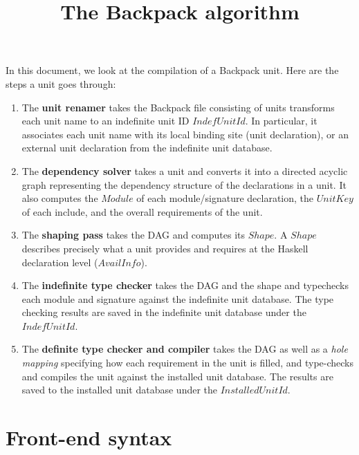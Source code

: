 \documentclass{article}
\title{The Backpack algorithm}
\newcommand{\I}[1]{\ensuremath{\mathit{#1}}}
\begin{document}
\maketitle

\noindent
In this document, we look at the compilation of a Backpack unit.
Here are the steps a unit goes through:

\begin{enumerate}
    \item The \textbf{unit renamer} takes the Backpack file consisting
    of units transforms each unit name to an indefinite unit ID \I{IndefUnitId}.
    In particular, it associates each unit name with its local binding
    site (unit declaration), or an external unit declaration from
    the indefinite unit database.

    \item The \textbf{dependency solver} takes a unit
    and converts it into a directed acyclic graph representing the
    dependency structure of the declarations in a unit.
    It also computes the \I{Module} of each module/signature
    declaration, the \I{UnitKey} of each include, and the overall
    requirements of the unit.

    \item The \textbf{shaping pass} takes the DAG
    and computes its \I{Shape}.  A \I{Shape} describes precisely what
    a unit provides and requires at the Haskell declaration level (\I{AvailInfo}).

    \item The \textbf{indefinite type checker} takes the DAG and the shape
    and typechecks each module and signature against the indefinite unit
    database.  The type checking results are saved in the indefinite
    unit database under the \I{IndefUnitId}.

    \item The \textbf{definite type checker and compiler} takes the DAG as well as a
    \emph{hole mapping} specifying how each requirement in the unit
    is filled, and type-checks and compiles the unit against the
    installed unit database.  The results are saved to the installed unit database
    under the \I{InstalledUnitId}.
\end{enumerate}

\section{Front-end syntax}
\end{document}
